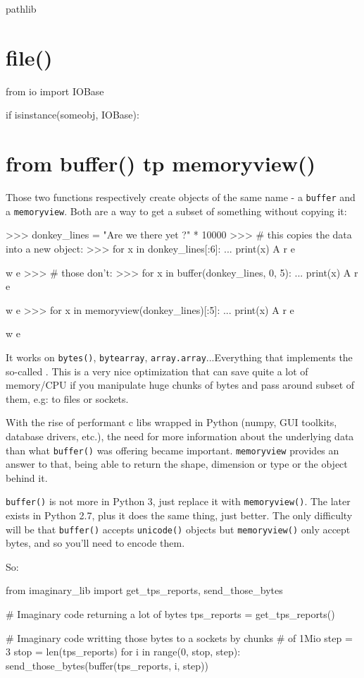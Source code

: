 
pathlib


\section{file()}

\begin{py2}
from io import IOBase

if isinstance(someobj, IOBase):
\end{py2}

\section{from buffer() tp memoryview()}

Those two functions respectively create objects of the same name - a \lstinline{buffer} and a \lstinline{memoryview}. Both are a way to get a subset of something without copying it:

\begin{py2}
>>> donkey_lines = "Are we there yet ?\n" * 10000
>>> # this copies the data into a new object:
>>> for x in donkey_lines[:6]:
...    print(x)
A
r
e

w
e
>>> # those don't:
>>> for x in buffer(donkey_lines, 0, 5):
...    print(x)
A
r
e

w
e
>>> for x in memoryview(donkey_lines)[:5]:
...    print(x)
A
r
e

w
e
\end{py2}

It works on \lstinline{bytes()}, \lstinline{bytearray}, \lstinline{array.array}...Everything that implements the so-called . This is a very nice optimization that can save quite a lot of memory/CPU if you manipulate huge chunks of bytes and pass around subset of them, e.g: to files or sockets.

With the rise of performant c libs wrapped in Python (numpy, GUI toolkits, database drivers, etc.), the need for more information about the underlying data than what \lstinline{buffer()} was offering became important. \lstinline{memoryview} provides an answer to that, being able to return the shape, dimension or type or the object behind it.

\lstinline{buffer()} is not more in Python 3, just replace it with \lstinline{memoryview()}. The later exists in Python 2.7, plus it does the same thing, just better. The only difficulty will be that \lstinline{buffer()} accepts \lstinline{unicode()} objects but \lstinline{memoryview()} only accept bytes, and so you'll need to encode them.

So:

\begin{py2}
from imaginary_lib import get_tps_reports, send_those_bytes

# Imaginary code returning a lot of bytes
tps_reports = get_tps_reports()

# Imaginary code writting those bytes to a sockets by chunks
# of 1Mio
step = 3
stop = len(tps_reports)
for i in range(0, stop, step):
    send_those_bytes(buffer(tps_reports, i, step))

\end{py2}

